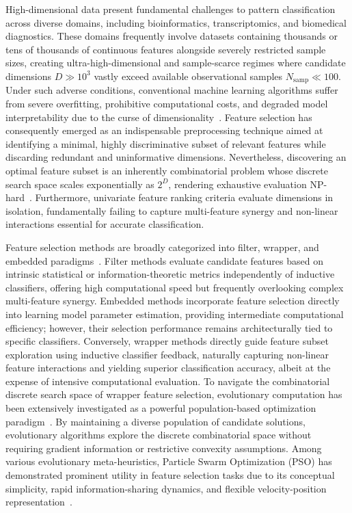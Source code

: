 \documentclass[final,5p,times,fleqn]{elsarticle}
\begin{document}
High-dimensional data present fundamental challenges to pattern classification across diverse domains, including bioinformatics, transcriptomics, and biomedical diagnostics. These domains frequently involve datasets containing thousands or tens of thousands of continuous features alongside severely restricted sample sizes, creating ultra-high-dimensional and sample-scarce regimes where candidate dimensions $D \gg 10^3$ vastly exceed available observational samples $N_{\mathrm{samp}} \ll 100$. Under such adverse conditions, conventional machine learning algorithms suffer from severe overfitting, prohibitive computational costs, and degraded model interpretability due to the curse of dimensionality~\cite{lili2017,guyon2003}. Feature selection has consequently emerged as an indispensable preprocessing technique aimed at identifying a minimal, highly discriminative subset of relevant features while discarding redundant and uninformative dimensions. Nevertheless, discovering an optimal feature subset is an inherently combinatorial problem whose discrete search space scales exponentially as $2^D$, rendering exhaustive evaluation NP-hard~\cite{liang2025}. Furthermore, univariate feature ranking criteria evaluate dimensions in isolation, fundamentally failing to capture multi-feature synergy and non-linear interactions essential for accurate classification.

Feature selection methods are broadly categorized into filter, wrapper, and embedded paradigms~\cite{kohavi1997,lili2017}. Filter methods evaluate candidate features based on intrinsic statistical or information-theoretic metrics independently of inductive classifiers, offering high computational speed but frequently overlooking complex multi-feature synergy. Embedded methods incorporate feature selection directly into learning model parameter estimation, providing intermediate computational efficiency; however, their selection performance remains architecturally tied to specific classifiers. Conversely, wrapper methods directly guide feature subset exploration using inductive classifier feedback, naturally capturing non-linear feature interactions and yielding superior classification accuracy, albeit at the expense of intensive computational evaluation. To navigate the combinatorial discrete search space of wrapper feature selection, evolutionary computation has been extensively investigated as a powerful population-based optimization paradigm~\cite{xue2016survey,liang2025,song2024}. By maintaining a diverse population of candidate solutions, evolutionary algorithms explore the discrete combinatorial space without requiring gradient information or restrictive convexity assumptions. Among various evolutionary meta-heuristics, Particle Swarm Optimization (PSO) has demonstrated prominent utility in feature selection tasks due to its conceptual simplicity, rapid information-sharing dynamics, and flexible velocity-position representation~\cite{kennedy1995,shi1998,kennedy1997}.
\end{document}
